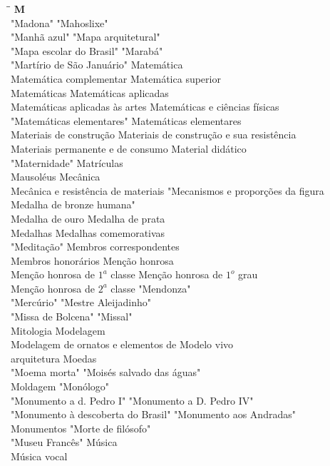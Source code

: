 \begin{tabbing}
	\hspace{8,7cm}\=\hspace{1cm}\=\kill
	\textbf{M} \>  \\ 
	"Madona"	\> "Mahoslixe"\\
	"Manhã azul" \> "Mapa arquitetural"\\
	"Mapa escolar do Brasil" \> "Marabá"\\
	"Martírio de São Januário" \> Matemática\\ 
	Matemática complementar \>  Matemática superior\\ 
	Matemáticas \> Matemáticas aplicadas\\ 
	Matemáticas aplicadas às artes \> Matemáticas e ciências físicas\\
	"Matemáticas elementares" \> Matemáticas elementares \\	
	Materiais de construção	\> Materiais de construção e sua resistência\\
	Materiais permanente e de consumo \> Material didático\\
	"Maternidade" \> Matrículas\\
	Mausoléus \> Mecânica\\ 
	Mecânica e resistência de materiais \>  "Mecanismos e proporções da figura\\ 
	Medalha de bronze \> humana"\\ 
	Medalha de ouro \> Medalha de prata\\
	Medalhas \> Medalhas comemorativas\\		   	   
	"Meditação"	\> Membros correspondentes\\
	Membros honorários \> Menção honrosa\\
	Menção honrosa de $1^a$ classe \> Menção honrosa de $1^o$ grau\\
	Menção honrosa de $2^a$ classe \> "Mendonza"\\ 
	"Mercúrio" \> "Mestre Aleijadinho"\\ 
	"Missa de Bolcena" \> "Missal"\\ 
	Mitologia \> Modelagem\\
	Modelagem de ornatos e elementos de \> Modelo vivo \\		   	   
	arquitetura	\> Moedas\\
	"Moema morta" \> "Moisés salvado das águas"\\
	Moldagem \> "Monólogo"\\
	"Monumento a d. Pedro I" \> "Monumento a D. Pedro IV"\\ 
	"Monumento à descoberta do Brasil" \>  "Monumento aos Andradas"\\ 
	Monumentos \> "Morte de filósofo"\\ 
	"Museu Francês" \> Música\\
	Música vocal \>  \\	   	   	   	   
\end{tabbing}

